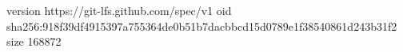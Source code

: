 version https://git-lfs.github.com/spec/v1
oid sha256:918f39df4915397a755364de0b51b7dacbbcd15d0789e1f38540861d243b31f2
size 168872
